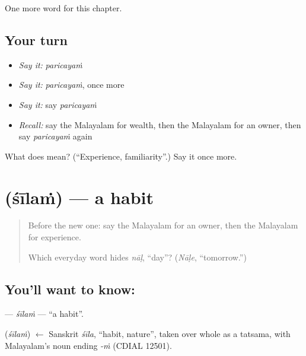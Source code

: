 \begin{grammarlens}[title={What you've built}]
One more word for this chapter.
\end{grammarlens}

\subsection*{Your turn}
\begin{itemize}
\raggedright
  \item \emph{Say it:} \emph{paricayaṁ}
  \item \emph{Say it:} \emph{paricayaṁ}, once more
  \item \emph{Say it:} say \emph{paricayaṁ}
  \item \emph{Recall:} say the Malayalam for wealth, then the Malayalam for an owner, then say \emph{paricayaṁ} again
\end{itemize}

\begin{tcolorbox}[breakable,colback=teal!4,colframe=teal!35!black,title={Before you move on}]
What does  mean? (\textquotedblleft{}Experience, familiarity\textquotedblright{}.) Say it once more.
\end{tcolorbox}
\section[\texorpdfstring{\ml{ശീലം} (śīlaṁ)}{ശീലം (śīlaṁ)}]{ (śīlaṁ) — a habit}

\label{lesson:ML-C143-silam}



\begin{quote}
Before the new one: say the Malayalam for an owner, then the Malayalam for experience.

Which everyday word hides \emph{nāḷ}, \textquotedblleft{}day\textquotedblright{}? (\emph{Nāḷe}, \textquotedblleft{}tomorrow.\textquotedblright{})
\end{quote}

\subsection*{You'll want to know: }
\textbf{} — \emph{śīlaṁ} — \textquotedblleft{}a habit\textquotedblright{}.

\begin{cousinweb}
\textbf{} (\emph{śīlaṁ}) $\leftarrow$ Sanskrit \emph{śīla}, \textquotedblleft{}habit, nature\textquotedblright{}, taken over whole as a tatsama, with Malayalam's noun ending \emph{-ṁ} (CDIAL 12501).
\end{cousinweb}

